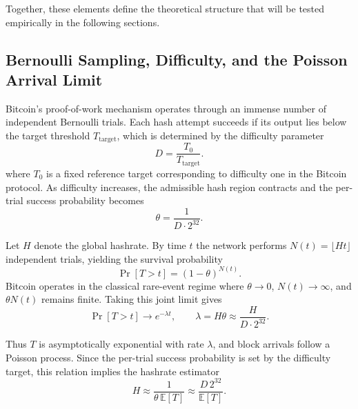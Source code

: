 \documentclass[conference]{IEEEtran}
\begin{document}
Together, these elements define the theoretical structure that will be tested empirically in the following sections.



\subsection{Bernoulli Sampling, Difficulty, and the Poisson Arrival Limit}

Bitcoin’s proof-of-work mechanism operates through an immense number of
independent Bernoulli trials. Each hash attempt succeeds if its output lies
below the target threshold $T_{\mathrm{target}}$, which is determined by the
difficulty parameter
\begin{equation}
D = \frac{T_0}{T_{\mathrm{target}}}.
\end{equation}
where $T_0$ is a fixed reference target corresponding to difficulty one in the Bitcoin protocol. As difficulty increases, the admissible hash region contracts and the per-trial
success probability becomes
\begin{equation}
\theta = \frac{1}{D \cdot 2^{32}}.
\end{equation}

Let $H$ denote the global hashrate. By time $t$ the network performs
$N(t)=\lfloor Ht \rfloor$ independent trials, yielding the survival probability
\begin{equation}
\Pr[T > t] = (1-\theta)^{N(t)}.
\end{equation}
Bitcoin operates in the classical rare-event regime where $\theta \to 0$,
$N(t)\to\infty$, and $\theta N(t)$ remains finite. Taking this joint limit gives
\cite{ross1996stochastic}
\begin{equation}
\Pr[T > t] \to e^{-\lambda t},
\qquad
\lambda = H\theta \approx \frac{H}{D \cdot 2^{32}}.
\end{equation}

Thus $T$ is asymptotically exponential with rate $\lambda$, and block
arrivals follow a Poisson process. Since the per-trial success probability is
set by the difficulty target, this relation implies the hashrate estimator
\begin{equation}
H \approx \frac{1}{\theta\,\mathbb{E}[T]} \approx \frac{D\,2^{32}}{\mathbb{E}[T]}.
\end{equation}
\end{document}
